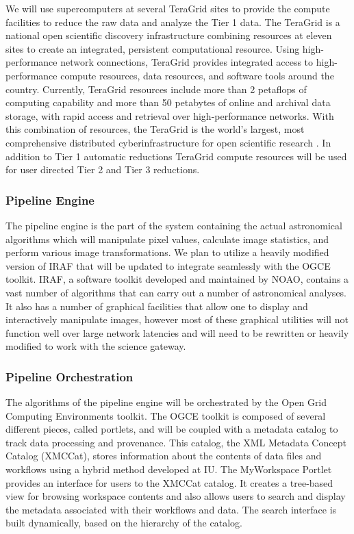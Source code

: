 \documentclass[10pt,conference]{IEEEtran}
\begin{document}
We will use supercomputers at several TeraGrid sites to provide the compute facilities to reduce the raw data and analyze the Tier 1 data. The TeraGrid is a national open scientific discovery infrastructure combining resources at eleven sites to create an integrated, persistent computational resource. Using high-performance network connections, TeraGrid provides integrated access to high-performance compute resources, data resources, and software tools around the country. Currently, TeraGrid resources include more than 2 petaflops of computing capability and more than 50 petabytes of online and archival data storage, with rapid access and retrieval over high-performance networks. With this combination of resources, the TeraGrid is the world's largest, most comprehensive distributed cyberinfrastructure for open scientific research \cite{teragrid}. In addition to Tier 1 automatic reductions TeraGrid compute resources will be used for user directed Tier 2 and Tier 3 reductions.

\subsubsection{Pipeline Engine}

The pipeline engine is the part of the system containing the actual astronomical algorithms which will manipulate pixel values, calculate image statistics, and perform various image transformations. We plan to utilize a heavily modified version of IRAF that will be updated to integrate seamlessly with the OGCE toolkit. IRAF, a software toolkit developed and maintained by NOAO, contains a vast number of algorithms that can carry out a number of astronomical analyses. It also has a number of graphical facilities that allow one to display and interactively manipulate images, however most of these graphical utilities will not function well over large network latencies and will need to be rewritten or heavily modified to work with the science gateway. 

\subsubsection{Pipeline Orchestration}

The algorithms of the pipeline engine will be orchestrated by the Open Grid Computing Environments toolkit. The OGCE toolkit is composed of several different pieces, called portlets, and will be coupled with a metadata catalog to track data processing and provenance. This catalog, the XML Metadata Concept Catalog (XMCCat)\cite{jensen2008}, stores information about the contents of data files and workflows using a hybrid method developed at IU. The MyWorkspace Portlet provides an interface for users to the XMCCat catalog. It creates a tree-based view for browsing workspace contents and also allows users to search and display the metadata associated with their workflows and data. The search interface is built dynamically, based on the hierarchy of the catalog. 
\end{document}

